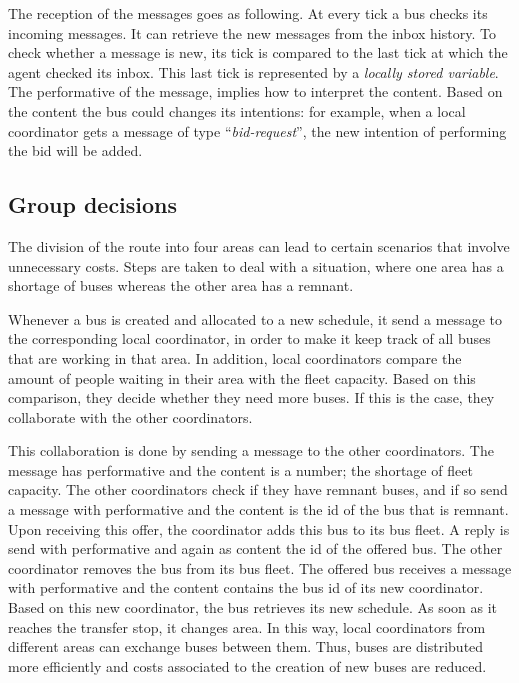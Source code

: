 The reception of the messages goes as following. At every tick a bus checks its incoming messages. It can retrieve the new messages from the inbox history. To check whether a message is new, its tick is compared to the last tick at which the agent checked its inbox. This last tick is represented by a \textit{locally stored variable}. The performative of the message, implies how to interpret the content. Based on the content the bus could changes its intentions: for example, when a local coordinator gets a message of type ``\textit{bid-request}'', the new intention of performing the bid will be added.

\subsection{Group decisions}

The division of the route into four areas can lead to certain scenarios that involve unnecessary costs. Steps are taken to deal with a situation, where one area has a shortage of buses whereas the other area has a remnant. 

Whenever a bus is created and allocated to a new schedule, it send a message to the corresponding local coordinator, in order to make it keep track of all buses that are working in that area. In addition, local coordinators compare the amount of people waiting in their area with the fleet capacity. Based on this comparison, they decide whether they need more buses. If this is the case, they collaborate with the other coordinators. 

This collaboration is done by sending a message to the other coordinators. The message has performative  and the content is a number; the shortage of fleet capacity. The other coordinators check if they have remnant buses, and if so send a message with performative  and the content is the id of the bus that is remnant. Upon receiving this offer, the coordinator adds this bus to its bus fleet. A reply is send with performative  and again as content the id of the offered bus. The other coordinator removes the bus from its bus fleet. The offered bus receives a message with performative  and the content contains the bus id of its new coordinator. Based on this new coordinator, the bus retrieves its new schedule. As soon as it reaches the transfer stop, it changes area. In this way, local coordinators from different areas can exchange buses between them. Thus, buses are distributed more efficiently and costs associated to the creation of new buses are reduced.

